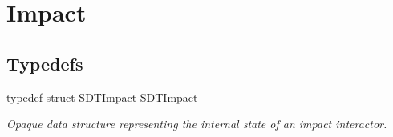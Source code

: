 \hypertarget{group__impact}{}\section{Impact}
\label{group__impact}
\subsection*{Typedefs}
\begin{DoxyCompactItemize}
\item 
\hypertarget{group__impact_gacfb0db11e829c7ef3beb7711b57cdc08}{}typedef struct \hyperlink{group__impact_gacfb0db11e829c7ef3beb7711b57cdc08}{S\+D\+T\+Impact} \hyperlink{group__impact_gacfb0db11e829c7ef3beb7711b57cdc08}{S\+D\+T\+Impact}\label{group__impact_gacfb0db11e829c7ef3beb7711b57cdc08}

\begin{DoxyCompactList}\small\item\em Opaque data structure representing the internal state of an impact interactor. \end{DoxyCompactList}\end{DoxyCompactItemize}
